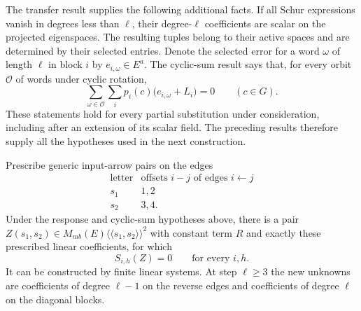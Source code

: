 The transfer result supplies the following additional facts.  If all Schur
expressions vanish in degrees less than $\ell$, their degree-$\ell$
coefficients are scalar on the projected eigenspaces.  The resulting tuples
belong to their active spaces and are determined by their selected entries.
Denote the selected error for a word $\omega$ of length $\ell$ in block
$i$ by $e_{i,\omega}\in E^a$.  The cyclic-sum result says that, for every
orbit $\mathcal O$ of words under cyclic rotation,
\begin{equation}
 \sum_{\omega\in\mathcal O}\sum_i
 p_i(c)\bigl(e_{i,\omega}+L_i\bigr)=0
 \qquad(c\in G).
 \label{eq:correction-cyclic-input}
\end{equation}
These statements hold for every partial substitution under consideration,
including after an extension of its scalar field.  The preceding results
therefore supply all the hypotheses used in the next construction.

\begin{proposition}
\label{prop:eleven-block-correction}
Prescribe generic input-arrow pairs on the edges
\[
 \begin{array}{c|c}
 \text{letter}&\text{offsets }i-j\text{ of edges }i\leftarrow j\\ \hline
 s_1&1,2\\
 s_2&3,4.
 \end{array}
\]
Under the response and cyclic-sum hypotheses above, there is a pair
$Z(s_1,s_2)\in M_{mb}(E)\langle\!\langle s_1,s_2\rangle\!\rangle^2$
with constant term $R$ and exactly these prescribed linear coefficients,
for which
\[
 S_{i,h}(Z)=0\qquad\text{for every }i,h.
\]
It can be constructed by finite linear systems.  At step $\ell\ge3$ the
new unknowns are coefficients of degree $\ell-1$ on the reverse edges
and coefficients of degree $\ell$ on the diagonal blocks.
\end{proposition}

